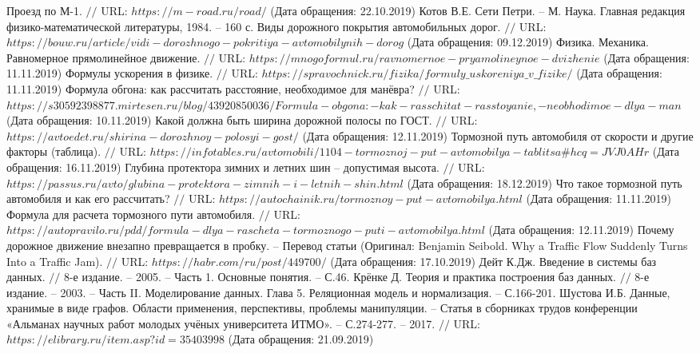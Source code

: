 \begin{thebibliography}{00}
	Проезд по М-1. $//$ URL: $https://m-road.ru/road/$ (Дата обращения: 22.10.2019)
	Котов В.Е. Сети Петри. -- М. Наука. Главная редакция физико-математической литературы, 1984. -- 160 с.
	Виды дорожного покрытия автомобильных дорог. $//$ URL: $https://bouw.ru/article/vidi-dorozhnogo-pokritiya-avtomobilynih-dorog$ (Дата обращения: 09.12.2019)
	Физика. Механика. Равномерное прямолинейное движение. $//$ URL: $https://mnogoformul.ru/ravnomernoe-pryamolineynoe-dvizhenie$ (Дата обращения: 11.11.2019)
	Формулы ускорения в физике. $//$ URL: $https://spravochnick.ru/fizika/formuly\_uskoreniya\_v\_fizike/$ (Дата обращения: 11.11.2019)
	Формула обгона: как рассчитать расстояние, необходимое для манёвра? $//$ URL: $https://s30592398877.mirtesen.ru/blog/43920850036/Formula-obgona:-kak-rasschitat-rasstoyanie,-neobhodimoe-dlya-man$ (Дата обращения: 10.11.2019)
	Какой должна быть ширина дорожной полосы по ГОСТ. $//$ URL: $https://avtoedet.ru/shirina-dorozhnoy-polosyi-gost/$ (Дата обращения: 12.11.2019)
	Тормозной путь автомобиля от скорости и другие факторы (таблица). $//$ URL: $https://infotables.ru/avtomobili/1104-tormoznoj-put-avtomobilya-tablitsa\#hcq=JVJ0AHr$ (Дата обращения: 16.11.2019)
	Глубина протектора зимних и летних шин -- допустимая высота. $//$ URL: $ https://passus.ru/avto/glubina-protektora-zimnih-i-letnih-shin.html$ (Дата обращения: 18.12.2019)
	Что такое тормозной путь автомобиля и как его рассчитать? $//$ URL: $https://autochainik.ru/tormoznoy-put-avtomobilya.html$ (Дата обращения: 11.11.2019)
	Формула для расчета тормозного пути автомобиля. $//$ URL: $https://autopravilo.ru/pdd/formula-dlya-rascheta-tormoznogo-puti-avtomobilya.html$ (Дата обращения: 12.11.2019)
	Почему дорожное движение внезапно превращается в пробку. -- Перевод статьи (Оригинал: Benjamin Seibold. Why a Traffic Flow Suddenly Turns Into a Traffic Jam). $//$ URL: $https://habr.com/ru/post/449700/$ (Дата обращения: 17.10.2019)
	Дейт К.Дж. Введение в системы баз данных. $//$ 8-е издание. -- 2005. -- Часть 1. Основные понятия. -- С.46.
	Крёнке Д. Теория и практика построения баз данных. $//$ 8-е издание. -- 2003. -- Часть II. Моделирование данных. Глава 5. Реляционная модель и нормализация. -- С.166-201.
	Шустова И.Б. Данные, хранимые в виде графов. Области применения, перспективы, проблемы манипуляции. -- Статья в сборниках трудов конференции «Альманах научных работ молодых учёных университета ИТМО». -- С.274-277. -- 2017. $//$ URL: $https://elibrary.ru/item.asp?id=35403998$ (Дата обращения: 21.09.2019)

\end{thebibliography}
